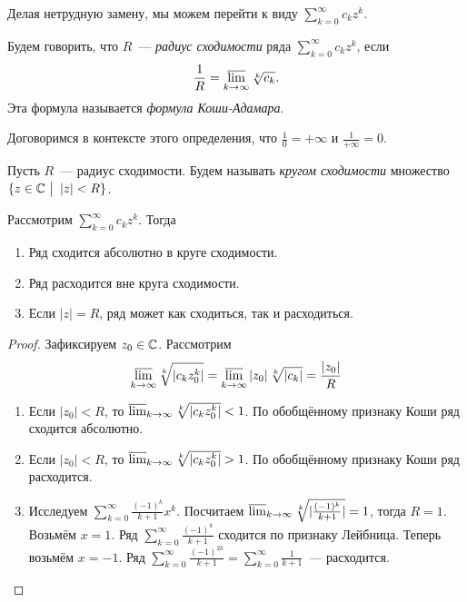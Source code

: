 \documentclass[../main.tex]{subfiles}
\begin{document}
\begin{note}
  Делая нетрудную замену, мы можем перейти к виду $ \sum_{k=0}^{\infty} c_k z^{k} $.
\end{note}


\begin{definition}
  Будем говорить, что $ R$~--- \emph{радиус сходимости} ряда $ \sum_{k=0}^{\infty} c_k z^k $, если 
  \begin{gather} 
    \frac{1}{R} = \operatorname*{\overline{\lim}}_{k \to \infty} \sqrt[k]{c_k } .
  \end{gather}
  Эта формула называется \emph{формула Коши-Адамара}.
\end{definition}

\begin{note}
    Договоримся в контексте этого определения, что $ \frac{1}{0} = + \infty$ и $ \frac{1}{+ \infty} = 0$.  
\end{note}


\begin{definition}
  Пусть $ R$~--- радиус сходимости. Будем называть \emph{кругом сходимости} множество $ \{ z \in \mathbb{C} \ \big|\  \left| z \right| < R \} $.  
\end{definition}

\begin{proposition}
  Рассмотрим $ \sum_{k=0}^{\infty} c_k z^k $.  Тогда 
  \begin{enumerate}
      \item Ряд сходится абсолютно в круге сходимости.
      \item Ряд расходится вне круга сходимости.
      \item Если $ \left| z \right| = R$, ряд может как сходиться, так и расходиться. 
  \end{enumerate}
\end{proposition}


\begin{proof}
    Зафиксируем $ z_0 \in \mathbb{C}$. Рассмотрим 
    \begin{gather} 
        \operatorname*{\overline{\lim}}_{k \to \infty} \sqrt[k]{|c_k z_0^k|} = \operatorname*{\overline{\lim}}_{k \to \infty} \left| z_0  \right| \sqrt[k]{|c_k |} = \frac{|z_0|}{R}
    \end{gather} 
    \begin{enumerate}
        \item Если $ \left| z_0  \right| < R$, то $ \operatorname*{\overline{\lim}}_{k \to \infty} \sqrt[k]{|c_k z_0 ^k|} < 1$. По обобщённому признаку Коши ряд сходится абсолютно.
        \item Если  $ \left| z_0  \right| < R$, то $ \operatorname*{\overline{\lim}}_{k \to \infty} \sqrt[k]{|c_k z_0 ^k|} > 1$. По обобщённому признаку Коши ряд расходится.
        \item Исследуем $ \sum_{k=0}^{\infty} \frac{(-1)^{k}}{k+1} x^{k} $. Посчитаем $ \operatorname*{\overline{\lim}}_{k \to \infty} \sqrt[k]{| \frac{(-1)^{k}}{k+1}|} = 1$, тогда $ R = 1$. Возьмём $ x = 1$. Ряд $ \sum_{k=0}^{\infty} \frac{(-1)^{k}}{k+1} $ сходится по признаку Лейбница. Теперь возьмём $ x = -1$. Ряд $  \sum_{k=0}^{\infty} \frac{(-1)^{2k}}{k+1} = \sum_{k=0}^{\infty} \frac{1}{k+1}  $~--- расходится.    
    \end{enumerate}
\end{proof}
\end{document}

